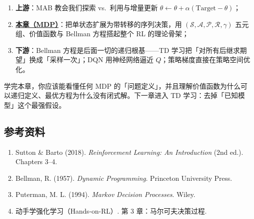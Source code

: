 \documentclass{article}
\begin{document}
\begin{enumerate}
  \item \textbf{上游}：MAB 教会我们探索 vs.\ 利用与增量更新 $\theta \leftarrow \theta+\alpha(\text{Target}-\theta)$；
  \item \underline{\textbf{本章（MDP）}}：把单状态扩展为带转移的序列决策，用 $(\mathcal{S},\mathcal{A},\mathcal{P},\mathcal{R},\gamma)$ 五元组、价值函数与 Bellman 方程搭起整个 RL 的理论骨架；
  \item \textbf{下游}：Bellman 方程是后面一切的递归根基——TD 学习把「对所有后继求期望」换成「采样一次」；DQN 用神经网络逼近 $Q$；策略梯度直接在策略空间优化。
\end{enumerate}

学完本章，你应该能看懂任何 MDP 的「问题定义」，并且理解价值函数为什么可以递归定义、最优方程为什么没有闭式解。下一章进入 TD 学习：去掉「已知模型」这个最强假设。

\subsection*{参考资料}

\begin{enumerate}
  \item Sutton \& Barto (2018). \textit{Reinforcement Learning: An Introduction} (2nd ed.). Chapters 3--4.
  \item Bellman, R. (1957). \textit{Dynamic Programming}. Princeton University Press.
  \item Puterman, M. L. (1994). \textit{Markov Decision Processes}. Wiley.
  \item 动手学强化学习（Hands-on-RL）. 第 3 章：马尔可夫决策过程.
\end{enumerate}
\end{document}
